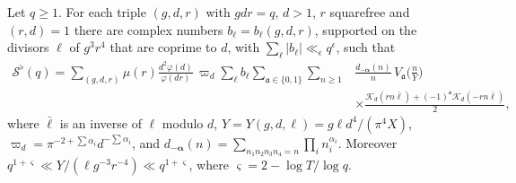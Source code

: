 \documentclass[11pt,colorlinks]{charlie}
\begin{document}
\begin{lemma}\label{lem:dualsum}
Let $q\ge1$. For each triple $(g,d,r)$ with $gdr=q$, $d>1$, $r$ squarefree and $(r,d)=1$ there are complex numbers $b_\ell=b_\ell(g,d,r)$, supported on the divisors $\ell$ of $g^3r^4$ that are coprime to $d$, with $\sum_\ell|b_\ell|\ll_\epsilon q^\epsilon$, such that
\[
 \begin{split}
 \mathcal S^\flat(q)=\sum_{(g,d,r)}\mu(r)\frac{d^2\varphi(d)}{\varphi(dr)}\,\varpi_d\sum_\ell b_\ell\sum_{\mathfrak a\in\{0,1\}}\sum_{n\ge1}&\frac{d_{-\boldsymbol\alpha}(n)}n\,V_{\mathfrak a}\Big(\frac nY\Big)\\
 &\times\frac{\mathscr K_d(rn\bar\ell)+(-1)^{\mathfrak a}\mathscr K_d(-rn\bar\ell)}2,
 \end{split}
\]
where $\bar\ell$ is an inverse of $\ell$ modulo $d$, $Y=Y(g,d,\ell)=g\ell d^4/(\pi^4X)$, $\varpi_d=\pi^{-2+\sum\alpha_i}d^{-\sum\alpha_i}$, and $d_{-\boldsymbol\alpha}(n)=\sum_{n_1n_2n_3n_4=n}\prod_in_i^{\alpha_i}$. Moreover $q^{1+\varsigma}\ll Y/(\ell g^{-3}r^{-4})\ll q^{1+\varsigma}$, where $\varsigma=2-\log T/\log q$.
\end{lemma}
\end{document}
